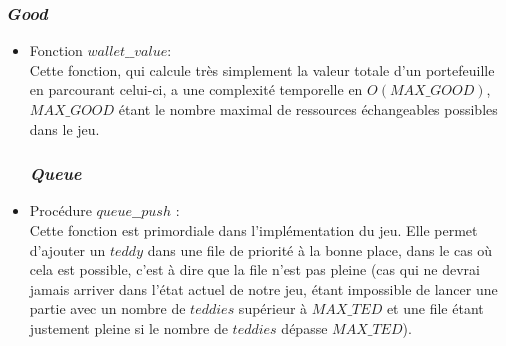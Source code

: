 \documentclass{article}
\begin{document}
\subsubsection{\textit{Good}}
\begin{itemize}
    \item Fonction $wallet\_\_value$:\\
    Cette fonction, qui calcule très simplement la valeur totale d'un portefeuille en parcourant celui-ci, a une complexité temporelle en $O(MAX\_GOOD)$, $MAX\_GOOD$ étant le nombre maximal de ressources échangeables possibles dans le jeu.\\
\subsubsection{\textit{Queue}}
    \item Procédure $queue\_\_push$ :\\
    Cette fonction est primordiale dans l'implémentation du jeu. Elle permet d'ajouter un $teddy$ dans une file de priorité à la bonne place, dans le cas où cela est possible, c'est à dire que la file n'est pas pleine (cas qui ne devrai jamais arriver dans l'état actuel de notre jeu, étant impossible de lancer une partie avec un nombre de $teddies$ supérieur à $MAX\_TED$ et une file étant justement pleine si le nombre de $teddies$ dépasse $MAX\_TED$). \\

\end{itemize}
\end{document}
